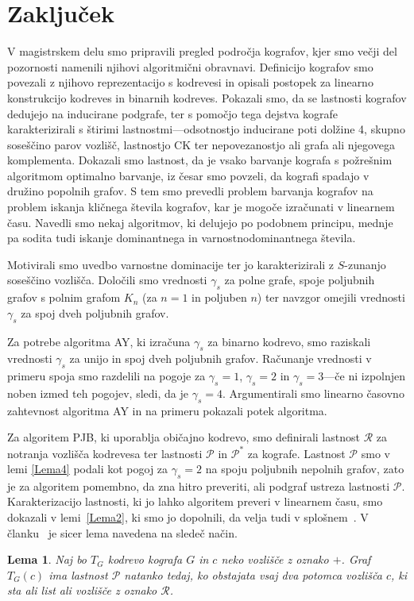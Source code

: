 \documentclass[12pt,a4paper,twoside]{article}
\theoremstyle{definition} %
\theoremstyle{plain} %
\newtheorem{lema}[definicija]{Lema}
\numberwithin{equation}{section}  %
\begin{document}
\section{Zaključek}
V magistrskem delu smo pripravili pregled področja kografov, kjer smo večji del pozornosti namenili njihovi algoritmični obravnavi. Definicijo kografov smo povezali z njihovo reprezentacijo s kodrevesi in opisali postopek za linearno konstrukcijo kodreves in binarnih kodreves. Pokazali smo, da se lastnosti kografov dedujejo na inducirane podgrafe, ter s pomočjo tega dejstva kografe karakterizirali s štirimi lastnostmi---odsotnostjo inducirane poti dolžine 4, skupno soseščino parov vozlišč, lastnostjo CK ter nepovezanostjo ali grafa ali njegovega komplementa. Dokazali smo lastnost, da je vsako barvanje kografa s požrešnim algoritmom optimalno barvanje, iz česar smo povzeli, da kografi spadajo v družino popolnih grafov. S tem smo prevedli problem barvanja kografov na problem iskanja kličnega števila kografov, kar je mogoče izračunati v linearnem času. Navedli smo nekaj algoritmov, ki delujejo po podobnem principu, mednje pa sodita tudi iskanje dominantnega in varnostnodominantnega števila.

Motivirali smo uvedbo varnostne dominacije ter jo karakterizirali z $S$-zunanjo soseščino vozlišča. Določili smo vrednosti $\gamma_s$ za polne grafe, spoje poljubnih grafov s polnim grafom $K_n$ (za $n=1$ in poljuben $n$) ter navzgor omejili vrednosti $\gamma_s$ za spoj dveh poljubnih grafov.

Za potrebe algoritma AY, ki izračuna $\gamma_s$ za binarno kodrevo, smo raziskali vrednosti $\gamma_s$ za unijo in spoj dveh poljubnih grafov. Računanje vrednosti v primeru spoja smo razdelili na pogoje za $\gamma_s=1$, $\gamma_s=2$ in $\gamma_s=3$---če ni izpolnjen noben izmed teh pogojev, sledi, da je $\gamma_s = 4$. Argumentirali smo linearno časovno zahtevnost algoritma AY in na primeru pokazali potek algoritma. 

Za algoritem PJB, ki uporablja običajno kodrevo, smo definirali lastnost $\mathcal{R}$ za notranja vozlišča kodrevesa ter lastnosti $\mathcal{P}$ in $\mathcal{P^*}$ za kografe. Lastnost $\mathcal{P}$ smo v lemi \ref{Lema4} podali kot pogoj za $\gamma_s = 2$ na spoju poljubnih nepolnih grafov, zato je za algoritem pomembno, da zna hitro preveriti, ali podgraf ustreza lastnosti $\mathcal{P}$. Karakterizacijo lastnosti, ki jo lahko algoritem preveri v linearnem času, smo dokazali v lemi~\ref{Lema2}, ki smo jo dopolnili, da velja tudi v splošnem~\cite{kisek2020onJha}. V članku~\cite{jha2019secure} je sicer lema navedena na sledeč način.
\begin{lema}{\rm{\cite[Lemma 2]{jha2019secure}}}\label{OriginalLemma2} Naj bo $T_G$ kodrevo kografa $G$ in $c$ neko vozlišče z oznako $+$. Graf $T_G(c)$ ima lastnost $\mathcal{P}$ natanko tedaj, ko obstajata vsaj dva potomca vozlišča $c$, ki sta ali list ali vozlišče z oznako $\mathcal{R}$.
\end{lema}
\end{document}

